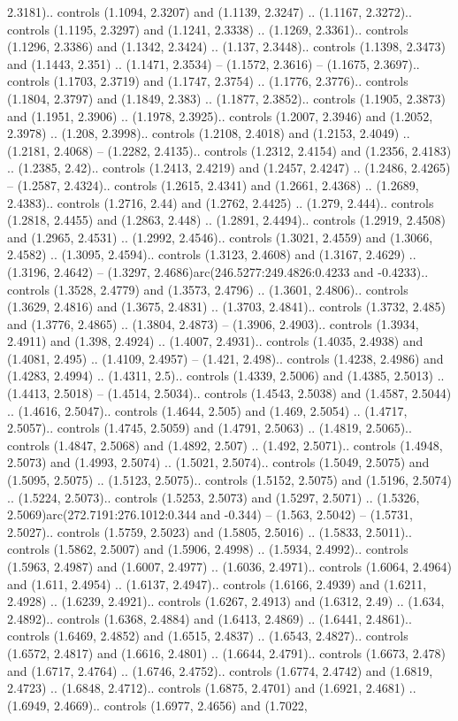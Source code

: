 2.3181).. controls (1.1094, 2.3207) and (1.1139, 2.3247) .. (1.1167, 2.3272).. controls (1.1195, 2.3297) and (1.1241, 2.3338) .. (1.1269, 2.3361).. controls (1.1296, 2.3386) and (1.1342, 2.3424) .. (1.137, 2.3448).. controls (1.1398, 2.3473) and (1.1443, 2.351) .. (1.1471, 2.3534) -- (1.1572, 2.3616) -- (1.1675, 2.3697).. controls (1.1703, 2.3719) and (1.1747, 2.3754) .. (1.1776, 2.3776).. controls (1.1804, 2.3797) and (1.1849, 2.383) .. (1.1877, 2.3852).. controls (1.1905, 2.3873) and (1.1951, 2.3906) .. (1.1978, 2.3925).. controls (1.2007, 2.3946) and (1.2052, 2.3978) .. (1.208, 2.3998).. controls (1.2108, 2.4018) and (1.2153, 2.4049) .. (1.2181, 2.4068) -- (1.2282, 2.4135).. controls (1.2312, 2.4154) and (1.2356, 2.4183) .. (1.2385, 2.42).. controls (1.2413, 2.4219) and (1.2457, 2.4247) .. (1.2486, 2.4265) -- (1.2587, 2.4324).. controls (1.2615, 2.4341) and (1.2661, 2.4368) .. (1.2689, 2.4383).. controls (1.2716, 2.44) and (1.2762, 2.4425) .. (1.279, 2.444).. controls (1.2818, 2.4455) and (1.2863, 2.448) .. (1.2891, 2.4494).. controls (1.2919, 2.4508) and (1.2965, 2.4531) .. (1.2992, 2.4546).. controls (1.3021, 2.4559) and (1.3066, 2.4582) .. (1.3095, 2.4594).. controls (1.3123, 2.4608) and (1.3167, 2.4629) .. (1.3196, 2.4642) -- (1.3297, 2.4686)arc(246.5277:249.4826:0.4233 and -0.4233).. controls (1.3528, 2.4779) and (1.3573, 2.4796) .. (1.3601, 2.4806).. controls (1.3629, 2.4816) and (1.3675, 2.4831) .. (1.3703, 2.4841).. controls (1.3732, 2.485) and (1.3776, 2.4865) .. (1.3804, 2.4873) -- (1.3906, 2.4903).. controls (1.3934, 2.4911) and (1.398, 2.4924) .. (1.4007, 2.4931).. controls (1.4035, 2.4938) and (1.4081, 2.495) .. (1.4109, 2.4957) -- (1.421, 2.498).. controls (1.4238, 2.4986) and (1.4283, 2.4994) .. (1.4311, 2.5).. controls (1.4339, 2.5006) and (1.4385, 2.5013) .. (1.4413, 2.5018) -- (1.4514, 2.5034).. controls (1.4543, 2.5038) and (1.4587, 2.5044) .. (1.4616, 2.5047).. controls (1.4644, 2.505) and (1.469, 2.5054) .. (1.4717, 2.5057).. controls (1.4745, 2.5059) and (1.4791, 2.5063) .. (1.4819, 2.5065).. controls (1.4847, 2.5068) and (1.4892, 2.507) .. (1.492, 2.5071).. controls (1.4948, 2.5073) and (1.4993, 2.5074) .. (1.5021, 2.5074).. controls (1.5049, 2.5075) and (1.5095, 2.5075) .. (1.5123, 2.5075).. controls (1.5152, 2.5075) and (1.5196, 2.5074) .. (1.5224, 2.5073).. controls (1.5253, 2.5073) and (1.5297, 2.5071) .. (1.5326, 2.5069)arc(272.7191:276.1012:0.344 and -0.344) -- (1.563, 2.5042) -- (1.5731, 2.5027).. controls (1.5759, 2.5023) and (1.5805, 2.5016) .. (1.5833, 2.5011).. controls (1.5862, 2.5007) and (1.5906, 2.4998) .. (1.5934, 2.4992).. controls (1.5963, 2.4987) and (1.6007, 2.4977) .. (1.6036, 2.4971).. controls (1.6064, 2.4964) and (1.611, 2.4954) .. (1.6137, 2.4947).. controls (1.6166, 2.4939) and (1.6211, 2.4928) .. (1.6239, 2.4921).. controls (1.6267, 2.4913) and (1.6312, 2.49) .. (1.634, 2.4892).. controls (1.6368, 2.4884) and (1.6413, 2.4869) .. (1.6441, 2.4861).. controls (1.6469, 2.4852) and (1.6515, 2.4837) .. (1.6543, 2.4827).. controls (1.6572, 2.4817) and (1.6616, 2.4801) .. (1.6644, 2.4791).. controls (1.6673, 2.478) and (1.6717, 2.4764) .. (1.6746, 2.4752).. controls (1.6774, 2.4742) and (1.6819, 2.4723) .. (1.6848, 2.4712).. controls (1.6875, 2.4701) and (1.6921, 2.4681) .. (1.6949, 2.4669).. controls (1.6977, 2.4656) and (1.7022, 